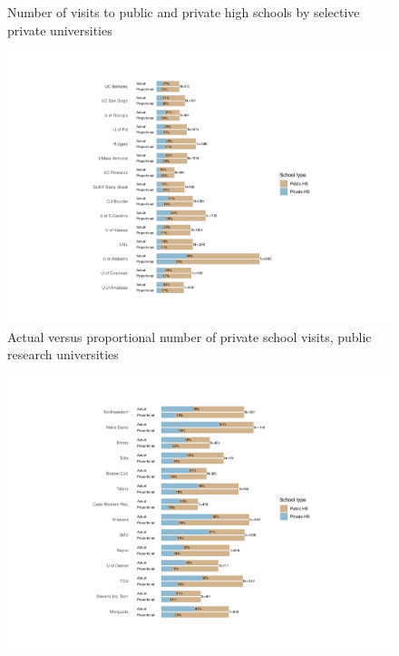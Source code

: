 \documentclass[
  12pt,
]{article}
\begin{document}
\begin{landscape}
\begin{figure}
{}

\caption{Number of visits to public and private high schools by selective private universities}\label{fig:events-hs-count-privu}
\end{figure}

\newpage

\begin{figure}

{\centering \includegraphics[width=2\linewidth]{../assets/figures/events_hs_actual_proportional_pubu} 

}

\caption{Actual versus proportional number of private school visits, public research universities}\label{fig:actual-proportional-pubu}
\end{figure}

\clearpage

\begin{figure}

{\centering \includegraphics[width=2\linewidth]{../assets/figures/events_hs_actual_proportional_privu} 

}
\end{figure}
\end{landscape}
\end{document}
